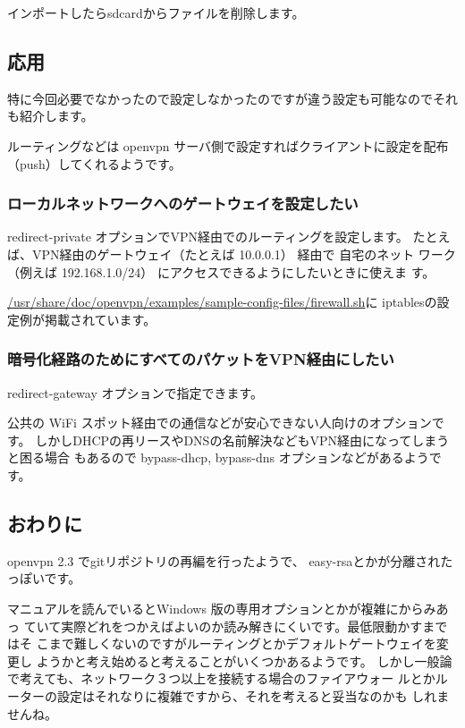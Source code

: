 \documentclass[mingoth,a4paper]{jsarticle}
\begin{document}
インポートしたらsdcardからファイルを削除します。

\subsection{応用}

特に今回必要でなかったので設定しなかったのですが違う設定も可能なのでそれ
も紹介します。

ルーティングなどは openvpn サーバ側で設定すればクライアントに設定を配布
（push）してくれるようです。

\subsubsection{ローカルネットワークへのゲートウェイを設定したい}

redirect-private オプションでVPN経由でのルーティングを設定します。
たとえば、VPN経由のゲートウェイ（たとえば 10.0.0.1） 経由で 自宅のネット
ワーク（例えば 192.168.1.0/24） にアクセスできるようにしたいときに使えま
す。

\url{/usr/share/doc/openvpn/examples/sample-config-files/firewall.sh}に
iptablesの設定例が掲載されています。

\subsubsection{暗号化経路のためにすべてのパケットをVPN経由にしたい}

redirect-gateway オプションで指定できます。

公共の WiFi スポット経由での通信などが安心できない人向けのオプションです。
しかしDHCPの再リースやDNSの名前解決などもVPN経由になってしまうと困る場合
もあるので bypass-dhcp, bypass-dns オプションなどがあるようです。

\subsection{おわりに}

openvpn 2.3 でgitリポジトリの再編を行ったようで、
easy-rsaとかが分離されたっぽいです。

マニュアルを読んでいるとWindows 版の専用オプションとかが複雑にからみあっ
ていて実際どれをつかえばよいのか読み解きにくいです。最低限動かすまではそ
こまで難しくないのですがルーティングとかデフォルトゲートウェイを変更し
ようかと考え始めると考えることがいくつかあるようです。
しかし一般論で考えても、ネットワーク３つ以上を接続する場合のファイアウォー
ルとかルーターの設定はそれなりに複雑ですから、それを考えると妥当なのかも
しれませんね。
\end{document}

